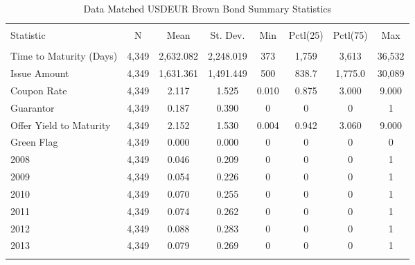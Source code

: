 
\begin{table}[!htbp] \centering 
  \footnotesize
  \caption{Data Matched USDEUR Brown Bond Summary Statistics} 
  \label{} 
\begin{tabular}{@{\extracolsep{5pt}}lccccccc} 
\\[-1.8ex]\hline 
\hline \\[-1.8ex] 
Statistic & \multicolumn{1}{c}{N} & \multicolumn{1}{c}{Mean} & \multicolumn{1}{c}{St. Dev.} & \multicolumn{1}{c}{Min} & \multicolumn{1}{c}{Pctl(25)} & \multicolumn{1}{c}{Pctl(75)} & \multicolumn{1}{c}{Max} \\ 
\hline \\[-1.8ex] 
Time to Maturity (Days) & 4,349 & 2,632.082 & 2,248.019 & 373 & 1,759 & 3,613 & 36,532 \\ 
Issue Amount & 4,349 & 1,631.361 & 1,491.449 & 500 & 838.7 & 1,775.0 & 30,089 \\ 
Coupon Rate & 4,349 & 2.117 & 1.525 & 0.010 & 0.875 & 3.000 & 9.000 \\ 
Guarantor & 4,349 & 0.187 & 0.390 & 0 & 0 & 0 & 1 \\ 
Offer Yield to Maturity & 4,349 & 2.152 & 1.530 & 0.004 & 0.942 & 3.060 & 9.000 \\ 
Green Flag & 4,349 & 0.000 & 0.000 & 0 & 0 & 0 & 0 \\ 
2008 & 4,349 & 0.046 & 0.209 & 0 & 0 & 0 & 1 \\ 
2009 & 4,349 & 0.054 & 0.226 & 0 & 0 & 0 & 1 \\ 
2010 & 4,349 & 0.070 & 0.255 & 0 & 0 & 0 & 1 \\ 
2011 & 4,349 & 0.074 & 0.262 & 0 & 0 & 0 & 1 \\ 
2012 & 4,349 & 0.088 & 0.283 & 0 & 0 & 0 & 1 \\ 
2013 & 4,349 & 0.079 & 0.269 & 0 & 0 & 0 & 1 \\ 
\hline \\[-1.8ex] 
\end{tabular} 
\end{table} 



